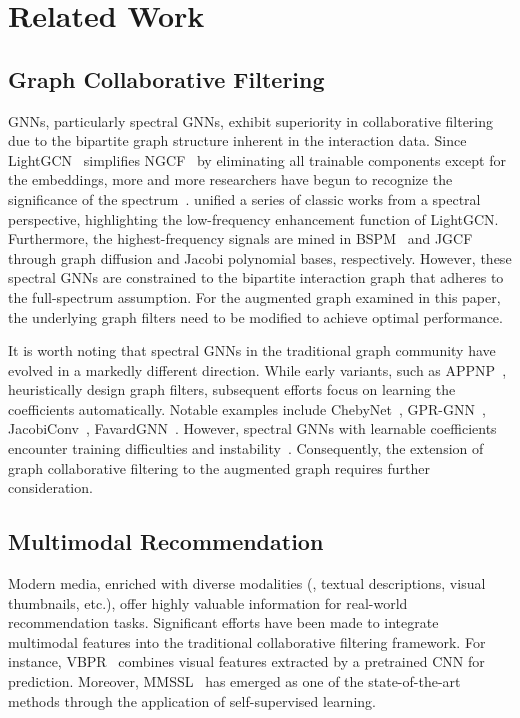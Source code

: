 \section{Related Work}
\subsection{Graph Collaborative Filtering}

GNNs, particularly spectral GNNs, 
exhibit superiority in collaborative filtering due to the bipartite graph structure inherent in the interaction data.
Since LightGCN~\cite{he2020lightgcn} simplifies NGCF~\cite{wang2019ngcf} by eliminating all trainable components except for the embeddings, 
more and more researchers have begun to recognize the significance of the spectrum~\cite{mao2021ultragcn,peng2022less}.
\citet{shen2021smoothing} unified a series of classic works from a spectral perspective, 
highlighting the low-frequency enhancement function of LightGCN.
Furthermore, the highest-frequency signals are mined in BSPM~\cite{choi2023blurring} and JGCF~\cite{guo2023jgcf} through graph diffusion and Jacobi polynomial bases, respectively.
However, these spectral GNNs are constrained to the bipartite interaction graph that adheres to the full-spectrum assumption. 
For the augmented graph examined in this paper, the underlying graph filters need to be modified to achieve optimal performance.

It is worth noting that spectral GNNs in the traditional graph community have evolved in a markedly different direction.
While early variants, 
such as APPNP~\cite{gasteiger2018appnp}, 
heuristically design graph filters, 
subsequent efforts focus on learning the coefficients automatically. 
Notable examples include ChebyNet~\cite{defferrard2016chebynet,he2022convolutional}, GPR-GNN~\cite{chien2021gprgnn}, JacobiConv~\cite{wang2022jacobiconv}, FavardGNN~\cite{guo2023favard}.
However, spectral GNNs with learnable coefficients encounter training difficulties and instability~\cite{he2020lightgcn,xu2023stablegcn}.
Consequently, the extension of graph collaborative filtering to the augmented graph requires further consideration.


\subsection{Multimodal Recommendation}
Modern media, enriched with diverse modalities (\eg, textual descriptions, visual thumbnails, etc.), 
offer highly valuable information for real-world recommendation tasks.
Significant efforts have been made to integrate multimodal features into the traditional collaborative filtering framework. 
For instance, VBPR~\cite{he2015vbpr} combines visual features extracted by a pretrained CNN for prediction. 
Moreover, MMSSL~\cite{wei2023mmssl} has emerged as one of the state-of-the-art methods through the application of self-supervised learning.

